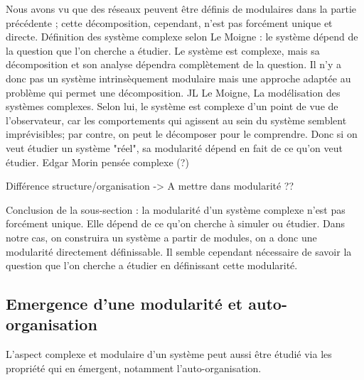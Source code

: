 Nous avons vu que des réseaux peuvent être définis de modulaires dans la partie précédente ; cette décomposition, cependant, n'est pas forcément unique et directe. 
Définition des système complexe selon Le Moigne : le système dépend de la question que l'on cherche a étudier. Le système est complexe, mais sa décomposition et son analyse dépendra complètement de la question. Il n'y a donc pas un système intrinsèquement modulaire mais une approche adaptée au problème qui permet une décomposition. JL Le Moigne, La modélisation des systèmes complexes. 
Selon lui, le système est complexe d'un point de vue de l'observateur, car les comportements qui agissent au sein du système semblent imprévisibles; par contre, on peut le décomposer pour le comprendre. 
Donc si on veut étudier un système "réel", sa modularité dépend en fait de ce qu'on veut étudier. 
Edgar Morin pensée complexe (?)

Différence structure/organisation -> A mettre dans modularité ?? 


Conclusion de la sous-section : la modularité d'un système complexe n'est pas forcément unique. Elle dépend de ce qu'on cherche à simuler ou étudier. Dans notre cas, on construira un système a partir de modules, on a donc une modularité directement définissable. Il semble cependant nécessaire de savoir la question que l'on cherche a étudier en définissant cette modularité. 

%
%

\subsection{Emergence d'une modularité et auto-organisation}

L'aspect complexe et modulaire d'un système peut aussi être étudié via les propriété qui en émergent, notamment l'auto-organisation.


